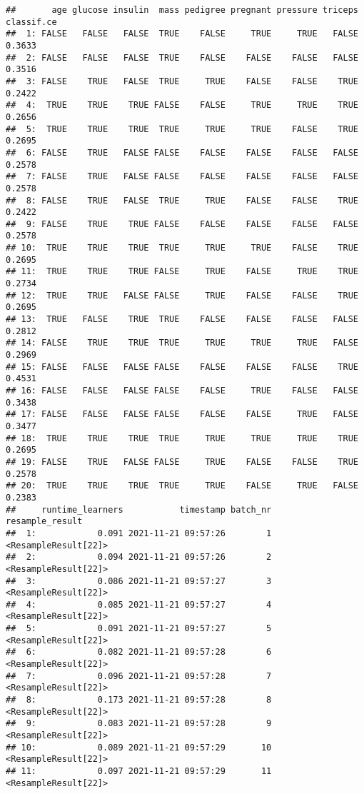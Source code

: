 \documentclass[
]{scrbook}
\begin{document}
\begin{verbatim}
##       age glucose insulin  mass pedigree pregnant pressure triceps classif.ce
##  1: FALSE   FALSE   FALSE  TRUE    FALSE     TRUE     TRUE   FALSE     0.3633
##  2: FALSE   FALSE   FALSE  TRUE    FALSE    FALSE    FALSE   FALSE     0.3516
##  3: FALSE    TRUE   FALSE  TRUE     TRUE    FALSE    FALSE    TRUE     0.2422
##  4:  TRUE    TRUE    TRUE FALSE    FALSE     TRUE     TRUE    TRUE     0.2656
##  5:  TRUE    TRUE    TRUE  TRUE     TRUE     TRUE    FALSE    TRUE     0.2695
##  6: FALSE    TRUE   FALSE FALSE    FALSE    FALSE    FALSE   FALSE     0.2578
##  7: FALSE    TRUE   FALSE FALSE    FALSE    FALSE    FALSE   FALSE     0.2578
##  8: FALSE    TRUE   FALSE  TRUE     TRUE    FALSE    FALSE    TRUE     0.2422
##  9: FALSE    TRUE    TRUE FALSE    FALSE    FALSE    FALSE   FALSE     0.2578
## 10:  TRUE    TRUE    TRUE  TRUE     TRUE     TRUE    FALSE    TRUE     0.2695
## 11:  TRUE    TRUE    TRUE FALSE     TRUE    FALSE     TRUE    TRUE     0.2734
## 12:  TRUE    TRUE   FALSE FALSE     TRUE    FALSE    FALSE    TRUE     0.2695
## 13:  TRUE   FALSE    TRUE  TRUE    FALSE    FALSE    FALSE   FALSE     0.2812
## 14: FALSE    TRUE    TRUE  TRUE     TRUE     TRUE     TRUE   FALSE     0.2969
## 15: FALSE   FALSE   FALSE FALSE    FALSE    FALSE    FALSE    TRUE     0.4531
## 16: FALSE   FALSE   FALSE FALSE    FALSE     TRUE    FALSE   FALSE     0.3438
## 17: FALSE   FALSE   FALSE FALSE    FALSE    FALSE     TRUE   FALSE     0.3477
## 18:  TRUE    TRUE    TRUE  TRUE     TRUE     TRUE     TRUE    TRUE     0.2695
## 19: FALSE    TRUE   FALSE FALSE     TRUE    FALSE    FALSE    TRUE     0.2578
## 20:  TRUE    TRUE    TRUE  TRUE     TRUE    FALSE     TRUE   FALSE     0.2383
##     runtime_learners           timestamp batch_nr      resample_result
##  1:            0.091 2021-11-21 09:57:26        1 <ResampleResult[22]>
##  2:            0.094 2021-11-21 09:57:26        2 <ResampleResult[22]>
##  3:            0.086 2021-11-21 09:57:27        3 <ResampleResult[22]>
##  4:            0.085 2021-11-21 09:57:27        4 <ResampleResult[22]>
##  5:            0.091 2021-11-21 09:57:27        5 <ResampleResult[22]>
##  6:            0.082 2021-11-21 09:57:28        6 <ResampleResult[22]>
##  7:            0.096 2021-11-21 09:57:28        7 <ResampleResult[22]>
##  8:            0.173 2021-11-21 09:57:28        8 <ResampleResult[22]>
##  9:            0.083 2021-11-21 09:57:28        9 <ResampleResult[22]>
## 10:            0.089 2021-11-21 09:57:29       10 <ResampleResult[22]>
## 11:            0.097 2021-11-21 09:57:29       11 <ResampleResult[22]>

\end{verbatim}
\end{document}

